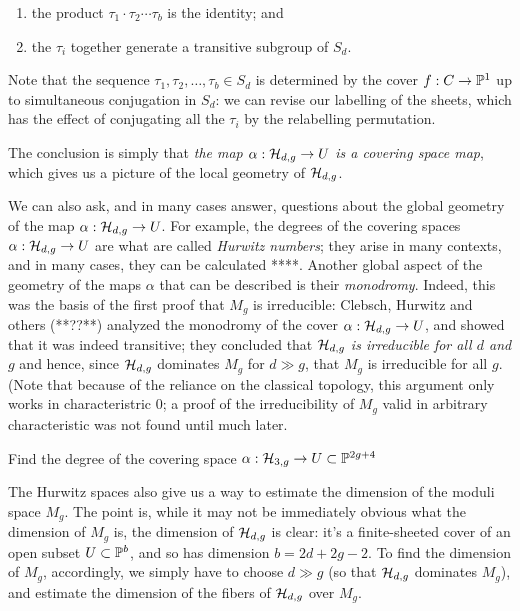 \begin{enumerate}
\item the product $\tau_1\cdot \tau_2 \cdots \tau_b$ is the identity; and
\item the $\tau_i$ together generate a transitive subgroup of $S_d$.
\end{enumerate}

Note that the sequence $\tau_1, \tau_2, \dots, \tau_b \in S_d$ is determined by the cover $f : C \to {\mathbb P}^1$ up to simultaneous conjugation in $S_d$: we can revise our labelling of the sheets, which has the effect of conjugating all the $\tau_i$ by the relabelling permutation.

The conclusion is simply that \emph{the map $\alpha : {\cal H}_{d,g} \to U$ is a covering space map}, which gives us a picture of the local geometry of ${\cal H}_{d,g}$. 

We can also ask, and in many cases answer, questions about the global geometry of the map $\alpha : {\cal H}_{d,g} \to U$. For example, the degrees of the covering spaces $\alpha : {\cal H}_{d,g} \to U$ are what are called \emph{Hurwitz numbers}; they arise in many contexts, and in many cases, they can be calculated **\cite{}**. Another global aspect of the geometry of the maps $\alpha$ that can be described is their \emph{monodromy}. Indeed, this  was the basis of the first proof that $M_g$ is irreducible: Clebsch, Hurwitz and others (**??**) analyzed the monodromy of the cover $\alpha : {\cal H}_{d,g} \to U$, and showed that it was indeed transitive; they concluded that \emph{${\cal H}_{d,g}$ is irreducible for all $d$ and $g$} and hence, since ${\cal H}_{d,g}$ dominates $M_g$ for $d \gg g$, that $M_g$ is irreducible for all $g$. (Note that because of the reliance on the classical topology, this argument only works in characteristric 0; a proof of the irreducibility of $M_g$ valid in arbitrary characteristic was not found until much later.

\begin{exercise}
Find the degree of the covering space $\alpha : {\cal H}_{3,g} \to U \subset {\mathbb P}^{2g+4}$
\end{exercise}

The Hurwitz spaces also give us a way to estimate the dimension of the moduli space $M_g$. The point is, while it may not be immediately obvious what the dimension of $M_g$ is, the dimension of ${\cal H}_{d,g}$ is clear: it's a finite-sheeted cover of an open subset $U \subset {\mathbb P}^b$, and so has dimension  $b = 2d+2g-2$. To find the dimension of $M_g$, accordingly, we simply have to choose $d \gg g$ (so that ${\cal H}_{d,g}$ dominates $M_g$), and estimate the dimension of the fibers of ${\cal H}_{d,g}$ over $M_g$.

